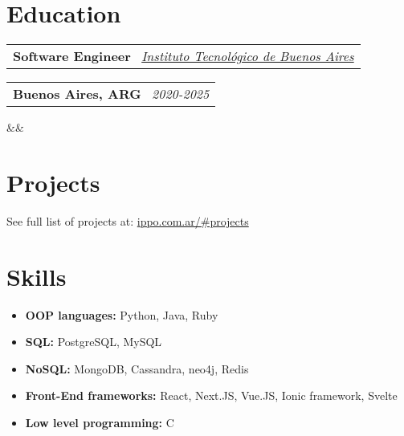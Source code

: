 \documentclass[11pt,a4paper,sans]{moderncv}
\makeatletter
\newcommand*{\customcventry}[7][.13em]{
\begin{tabular}{@{}l}
{\bfseries #4} \
{\itshape #3}
\end{tabular}
\hfill
\begin{tabular}{l@{}}
{\bfseries #5} \
{\itshape #2}
\end{tabular}
\ifx&#7&%
\else{\
\begin{minipage}{\maincolumnwidth}%
\small#7%
\end{minipage}}\fi%
\par\addvspace{#1}}
\makeatother
\begin{document}

\section{Education}
\customcventry{2020-2025}{\color{blue}\href{https://www.itba.edu.ar/}{Instituto Tecnológico de Buenos Aires}}{Software Engineer}{Buenos Aires, ARG}{}{}{}


\section{Projects}
See full list of projects at: {\color{blue} \href{https://www.ippo.com.ar/\#projects}{ippo.com.ar/\#projects}}


\section{Skills}
{\begin{itemize}[label=\textbullet]
\item {\textbf{OOP languages:} Python, Java, Ruby}
\item {\textbf{SQL:} PostgreSQL, MySQL}
\item {\textbf{NoSQL:} MongoDB, Cassandra, neo4j, Redis}
\item {\textbf{Front-End frameworks:} React, Next.JS, Vue.JS, Ionic framework, Svelte}
\item {\textbf{Low level programming:} C}
\end{itemize}}
\end{document}
